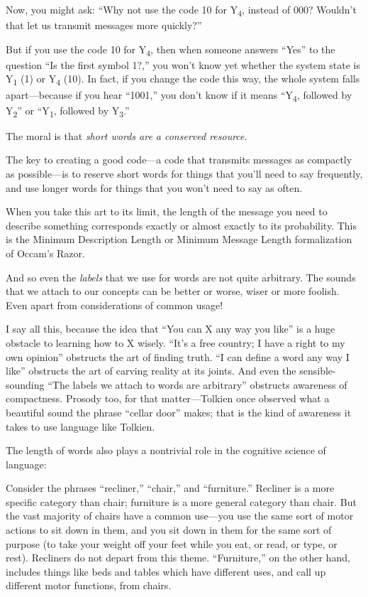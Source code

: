 {
 Now, you might ask: ``Why not use the code 10 for
Y\textsubscript{4}, instead of 000? Wouldn't that let
us transmit messages more quickly?''}

{
 But if you use the code 10 for Y\textsubscript{4}, then when
someone answers ``Yes'' to the
question ``Is the first symbol 1?,''
you won't know yet whether the system state is
Y\textsubscript{1} (1) or Y\textsubscript{4} (10). In fact, if you
change the code this way, the whole system falls apart---because if you
hear ``1001,'' you
don't know if it means
``Y\textsubscript{4}, followed by
Y\textsubscript{2}'' or
``Y\textsubscript{1}, followed by
Y\textsubscript{3}.''}

{
 The moral is that \textit{short words are a conserved resource}.}

{
 The key to creating a good code---a code that transmits messages
as compactly as possible---is to reserve short words for things that
you'll need to say frequently, and use longer words for
things that you won't need to say as often.}

{
 When you take this art to its limit, the length of the message you
need to describe something corresponds exactly or almost exactly to its
probability. This is the Minimum Description Length or Minimum Message
Length formalization of Occam's Razor.}

{
 And so even the \textit{labels} that we use for words are not
quite arbitrary. The sounds that we attach to our concepts can be
better or worse, wiser or more foolish. Even apart from considerations
of common usage!}

{
 I say all this, because the idea that ``You can X
any way you like'' is a huge obstacle to learning how
to X wisely. ``It's a free country; I
have a right to my own opinion'' obstructs the art of
finding truth. ``I can define a word any way I
like'' obstructs the art of carving reality at its
joints. And even the sensible-sounding ``The labels we
attach to words are arbitrary'' obstructs awareness
of compactness. Prosody too, for that matter---Tolkien once observed
what a beautiful sound the phrase ``cellar
door'' makes; that is the kind of awareness it takes
to use language like Tolkien.}

{
 The length of words also plays a nontrivial role in the cognitive
science of language:}

{
 Consider the phrases
``recliner,''
``chair,'' and
``furniture.'' Recliner is a more
specific category than chair; furniture is a more general category than
chair. But the vast majority of chairs have a common use---you use the
same sort of motor actions to sit down in them, and you sit down in
them for the same sort of purpose (to take your weight off your feet
while you eat, or read, or type, or rest). Recliners do not depart from
this theme. ``Furniture,'' on the
other hand, includes things like beds and tables which have different
uses, and call up different motor functions, from chairs.}

